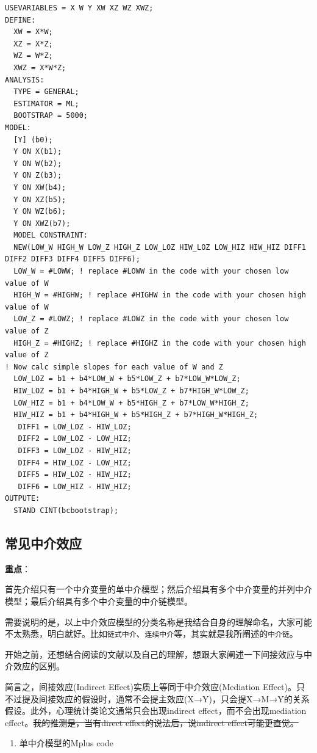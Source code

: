 \documentclass[
]{book}
\providecommand{\tightlist}{%
  \setlength{\itemsep}{0pt}\setlength{\parskip}{0pt}}
\begin{document}
\begin{verbatim}
USEVARIABLES = X W Y XW XZ WZ XWZ;
DEFINE: 
  XW = X*W; 
  XZ = X*Z; 
  WZ = W*Z; 
  XWZ = X*W*Z;
ANALYSIS: 
  TYPE = GENERAL; 
  ESTIMATOR = ML; 
  BOOTSTRAP = 5000;
MODEL: 
  [Y] (b0); 
  Y ON X(b1); 
  Y ON W(b2); 
  Y ON Z(b3); 
  Y ON XW(b4); 
  Y ON XZ(b5); 
  Y ON WZ(b6); 
  Y ON XWZ(b7);
  MODEL CONSTRAINT: 
  NEW(LOW_W HIGH_W LOW_Z HIGH_Z LOW_LOZ HIW_LOZ LOW_HIZ HIW_HIZ DIFF1 DIFF2 DIFF3 DIFF4 DIFF5 DIFF6);
  LOW_W = #LOWW; ! replace #LOWW in the code with your chosen low value of W
  HIGH_W = #HIGHW; ! replace #HIGHW in the code with your chosen high value of W
  LOW_Z = #LOWZ; ! replace #LOWZ in the code with your chosen low value of Z
  HIGH_Z = #HIGHZ; ! replace #HIGHZ in the code with your chosen high value of Z
! Now calc simple slopes for each value of W and Z
  LOW_LOZ = b1 + b4*LOW_W + b5*LOW_Z + b7*LOW_W*LOW_Z;
  HIW_LOZ = b1 + b4*HIGH_W + b5*LOW_Z + b7*HIGH_W*LOW_Z;
  LOW_HIZ = b1 + b4*LOW_W + b5*HIGH_Z + b7*LOW_W*HIGH_Z;
  HIW_HIZ = b1 + b4*HIGH_W + b5*HIGH_Z + b7*HIGH_W*HIGH_Z;
   DIFF1 = LOW_LOZ - HIW_LOZ;
   DIFF2 = LOW_LOZ - LOW_HIZ;
   DIFF3 = LOW_LOZ - HIW_HIZ;
   DIFF4 = HIW_LOZ - LOW_HIZ;
   DIFF5 = HIW_LOZ - HIW_HIZ;
   DIFF6 = LOW_HIZ - HIW_HIZ;
OUTPUTE:
  STAND CINT(bcbootstrap);
\end{verbatim}

\hypertarget{normme}{%
\subsection{常见中介效应}\label{normme}}

\textbf{重点}：

首先介绍只有一个中介变量的单中介模型；然后介绍具有多个中介变量的并列中介模型；最后介绍具有多个中介变量的中介链模型。

需要说明的是，以上中介效应模型的分类名称是我结合自身的理解命名，大家可能不太熟悉，明白就好。比如\texttt{链式中介}、\texttt{连续中介}等，其实就是我所阐述的\texttt{中介链}。

开始之前，还想结合阅读的文献以及自己的理解，想跟大家阐述一下间接效应与中介效应的区别。

简言之，间接效应(Indirect Effect)实质上等同于中介效应(Mediation Effect)。只不过提及间接效应的假设时，通常不会提主效应(X→Y)，只会提X→M→Y的关系假设。此外，心理统计类论文通常只会出现indirect effect，而不会出现mediation effect。\sout{我的推测是，当有direct effect的说法后，说indirect effect可能更直觉。}

\begin{enumerate}
\def\labelenumi{\arabic{enumi}.}
\tightlist
\item
  单中介模型的Mplus code
\end{enumerate}
\end{document}
